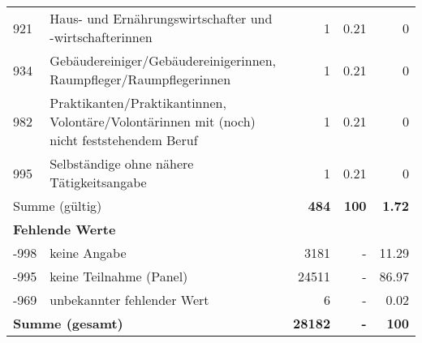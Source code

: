 \begin{longtable}{lXrrr}
        921 & \multicolumn{1}{X}{Haus- und Ernährungswirtschafter und -wirtschafterinnen} & %
          \num{1} &
          \num[round-mode=places,round-precision=2]{0.21} &
          \num[round-mode=places,round-precision=2]{0} \\

        934 & \multicolumn{1}{X}{Gebäudereiniger/Gebäudereinigerinnen, Raumpfleger/Raumpflegerinnen} & %
          \num{1} &
          \num[round-mode=places,round-precision=2]{0.21} &
          \num[round-mode=places,round-precision=2]{0} \\

        982 & \multicolumn{1}{X}{Praktikanten/Praktikantinnen, Volontäre/Volontärinnen mit (noch) nicht feststehendem Beruf} & %
          \num{1} &
          \num[round-mode=places,round-precision=2]{0.21} &
          \num[round-mode=places,round-precision=2]{0} \\

        995 & \multicolumn{1}{X}{Selbständige ohne nähere Tätigkeitsangabe} & %
          \num{1} &
          \num[round-mode=places,round-precision=2]{0.21} &
          \num[round-mode=places,round-precision=2]{0} \\

     \midrule
     \multicolumn{2}{l}{Summe (gültig)} &
       \textbf{\num{484}} &
     \textbf{100} &
       \textbf{\num[round-mode=places,round-precision=2]{1.72}} \\
     \multicolumn{5}{l}{\textbf{Fehlende Werte}}\\
       -998 &
       keine Angabe &
         \num{3181} &
        - &
         \num[round-mode=places,round-precision=2]{11.29} \\
       -995 &
       keine Teilnahme (Panel) &
         \num{24511} &
        - &
         \num[round-mode=places,round-precision=2]{86.97} \\
       -969 &
       unbekannter fehlender Wert &
         \num{6} &
        - &
         \num[round-mode=places,round-precision=2]{0.02} \\
     \midrule
     \multicolumn{2}{l}{\textbf{Summe (gesamt)}} &
          \textbf{\num{28182}} &
        \textbf{-} &
        \textbf{100} \\
     \bottomrule
     \end{longtable}
     
